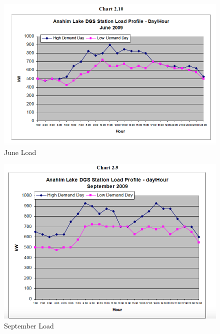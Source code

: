 \documentclass[11pt]{article}
\makeatletter
\def\maxwidth{\ifdim\Gin@nat@width>\linewidth\linewidth
    \else\Gin@nat@width\fi}
\let\Oldincludegraphics\includegraphics
\renewcommand{\includegraphics}[1]{\Oldincludegraphics[width=.8\maxwidth]{#1}}
\makeatother
\begin{document}
\begin{figure}
\centering
\includegraphics{images/junload.png}
\caption{June Load}
\end{figure}

\begin{figure}
\centering
\includegraphics{images/septload.png}
\caption{September Load}
\end{figure}
\end{document}
